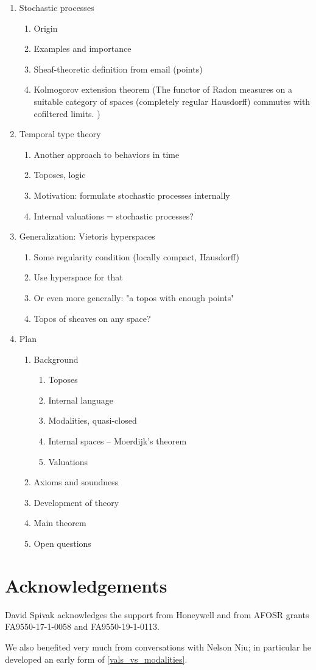 \documentclass[11pt, oneside, article]{memoir}
\theoremstyle{plain}
\theoremstyle{definition}
\theoremstyle{remark}
\begin{document}
\begin{enumerate}
	\item Stochastic processes
  \begin{enumerate}
  	\item Origin
		\item Examples and importance
		\item Sheaf-theoretic definition from email (points)
		\item Kolmogorov extension theorem (The functor of Radon measures on a suitable category of spaces (completely regular Hausdorff) commutes with cofiltered limits.
		)
	\end{enumerate}	
	\item Temporal type theory
  \begin{enumerate}
  	\item Another approach to behaviors in time
		\item Toposes, logic
		\item Motivation: formulate stochastic processes internally
		\item Internal valuations = stochastic processes?
	\end{enumerate}	
	\item Generalization: Vietoris hyperspaces
  \begin{enumerate}
  	\item Some regularity condition (locally compact, Hausdorff)
		\item Use hyperspace for that
		\item Or even more generally: "a topos with enough points"
		\item Topos of sheaves on any space?
	\end{enumerate}	
		
	\item Plan
  \begin{enumerate}
  	\item Background
	  \begin{enumerate}
	  	\item Toposes
			\item Internal language
			\item Modalities, quasi-closed
			\item Internal spaces -- Moerdijk's theorem
			\item Valuations
		\end{enumerate}
		\item Axioms and soundness
		\item Development of theory
		\item Main theorem
		\item Open questions
	\end{enumerate}	
\end{enumerate}

\section*{Acknowledgements}
David Spivak acknowledges the support from Honeywell and from AFOSR grants FA9550-17-1-0058 and FA9550-19-1-0113.

We also benefited very much from conversations with Nelson Niu; in particular he developed an early form of \cref{vals_vs_modalities}.

\printbibliography
\end{document}
